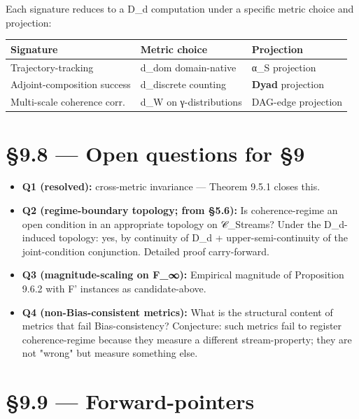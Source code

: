 \documentclass[11pt, openany]{book}
\newcommand{\sectionbreak}{\clearpage}
\begin{document}
Each signature reduces to a D\_\allowbreak{}d computation under a specific metric choice and projection:

\begingroup\setlength{\tabcolsep}{3pt}\renewcommand{\arraystretch}{1.15}\footnotesize
\begin{center}
\begin{tabular}{p{1.72in} p{1.40in} p{1.21in}}
\toprule
Signature & Metric choice & Projection \\
\midrule
Trajectory-tracking & d\_\allowbreak{}dom domain-native & α\_\allowbreak{}S projection \\
Adjoint-composition success & d\_\allowbreak{}discrete counting & \textbf{Dyad} projection \\
Multi-scale coherence corr. & d\_\allowbreak{}W on γ-distributions & DAG-edge projection \\
\bottomrule
\end{tabular}
\end{center}
\endgroup
\sectionbreak

\section{§9.8 --- Open questions for §9}

\begin{itemize}
\item \textbf{Q1 (resolved):} cross-metric invariance --- Theorem 9.5.1 closes this.
\item \textbf{Q2 (regime-boundary topology; from §5.6):} Is coherence-regime an open condition in an appropriate topology on 𝒞\_\allowbreak{}Streams? Under the D\_\allowbreak{}d-induced topology: yes, by continuity of D\_\allowbreak{}d + upper-semi-continuity of the joint-condition conjunction. Detailed proof carry-forward.
\item \textbf{Q3 (magnitude-scaling on F\_\allowbreak{}∞):} Empirical magnitude of Proposition 9.6.2 with F' instances as candidate-above.
\item \textbf{Q4 (non-Bias-consistent metrics):} What is the structural content of metrics that fail Bias-consistency? Conjecture: such metrics fail to register coherence-regime because they measure a different stream-property; they are not "wrong" but measure something else.
\end{itemize}

\sectionbreak

\section{§9.9 --- Forward-pointers}
\end{document}
